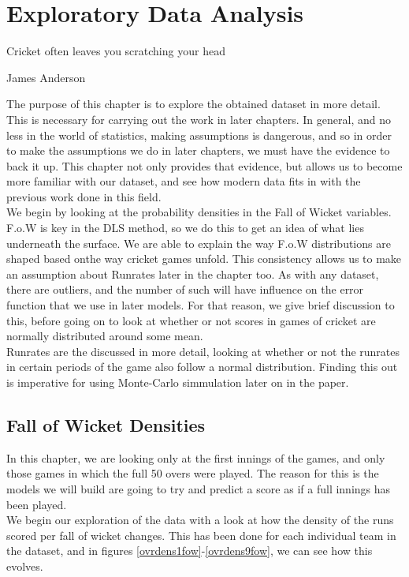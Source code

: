 \chapter{Exploratory Data Analysis}

\epigraph{Cricket often leaves you scratching your head}{James Anderson}

The purpose of this chapter is to explore the obtained dataset in more detail. This is necessary for carrying out the work in later chapters. In general, and no less
in the world of statistics, making assumptions is dangerous, and so in order to make the assumptions we do in later chapters, we must have the evidence to back it up.
This chapter not only provides that evidence, but allows us to become more familiar with our dataset, and see how modern data fits in with the previous work done in this 
field. \\
We begin by looking at the probability densities in the Fall of Wicket variables. F.o.W is key in the DLS method, so we do this to get an idea of what lies underneath the
surface. We are able to explain the way F.o.W distributions are shaped based onthe way cricket games unfold. This consistency allows us to make an assumption about Runrates
later in the chapter too. 
As with any dataset, there are outliers, and the number of such will have influence on the error function that we use in later models. For that reason, we give brief discussion 
to this, before going on to look at whether or not scores in games of cricket are normally distributed around some mean. \\
Runrates are the discussed in more detail, looking at whether or not the runrates in certain periods of the game also follow a normal distribution. Finding this out is imperative
for using Monte-Carlo simmulation later on in the paper.

\section{Fall of Wicket Densities}

In this chapter, we are looking only at the first innings of the games, and only those games in which the full 50 overs were played. The 
reason for this is the models we will build are going to try and predict a score as if a full innings has been played. \\

We begin our exploration of the data with a look at how the density of the runs scored per fall of wicket changes. This has been done for each
individual team in the dataset, and in figures \ref{ovrdens1fow}-\ref{ovrdens9fow}, we can see how this evolves.  

